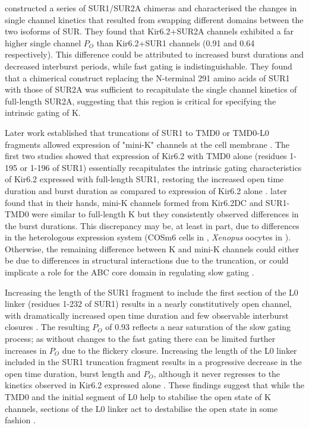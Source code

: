 \citeauthor{babenko_two_1999} constructed a series of SUR1/SUR2A chimeras and characterised the changes in single channel kinetics that resulted from swapping different domains between the two isoforms of SUR.
They found that Kir6.2+SUR2A channels exhibited a far higher single channel $P_O$ than Kir6.2+SUR1 channels (0.91 and 0.64 respectively).
This difference could be attributed to increased burst durations and decreased interburst periods, while fast gating is indistinguishable.
They found that a chimerical construct replacing the N-terminal 291 amino acids of SUR1 with those of SUR2A was sufficient to recapitulate the single channel kinetics of full-length SUR2A, suggesting that this region is critical for specifying the intrinsic gating of K\ATP{}.

Later work established that truncations of SUR1 to TMD0 or TMD0-L0 fragments allowed expression of "mini-K\ATP{}" channels at the cell membrane \cite{babenko_sur_2003, chan_n-terminal_2003, fang_n-terminal_2006}.
The first two studies showed that expression of Kir6.2 with TMD0 alone (residues 1-195 or 1-196 of SUR1) essentially recapitulates the intrinsic gating characteristics of Kir6.2 expressed with full-length SUR1, restoring the increased open time duration and burst duration as compared to expression of Kir6.2 alone \cite{babenko_sur_2003, chan_n-terminal_2003}.
\citeauthor{fang_n-terminal_2006} later found that in their hands, mini-K\ATP{} channels formed from Kir6.2\textgreek{D}C and SUR1-TMD0 were similar to full-length K\ATP{} but they consistently observed differences in the burst durations.
This discrepancy may be, at least in part, due to differences in the heterologous expression system (COSm6 cells in \cite{babenko_sur_2003}, \textit{Xenopus} oocytes in \cite{fang_n-terminal_2006}).
Otherwise, the remaining difference between K\ATP{} and mini-K\ATP{} channels could either be due to differences in structural interactions due to the truncation, or could implicate a role for the ABC core domain in regulating slow gating \cite{fang_n-terminal_2006}.

Increasing the length of the SUR1 fragment to include the first section of the L0 linker (residues 1-232 of SUR1) results in a nearly constitutively open channel, with dramatically increased open time duration and few observable interburst closures \cite{babenko_sur_2003}.
The resulting $P_O$ of 0.93 reflects a near saturation of the slow gating process; as without changes to the fast gating there can be limited further increases in $P_O$ due to the flickery closure.
Increasing the length of the L0 linker included in the SUR1 truncation fragment results in a progressive decrease in the open time duration, burst length and $P_O$, although it never regresses to the kinetics observed in Kir6.2 expressed alone \cite{babenko_sur_2003}.
These findings suggest that while the TMD0 and the initial segment of L0 help to stabilise the open state of K\ATP{} channels, sections of the L0 linker act to destabilise the open state in some fashion \cite{babenko_sur_2003, puljung_cryo-electron_2018-1}.

